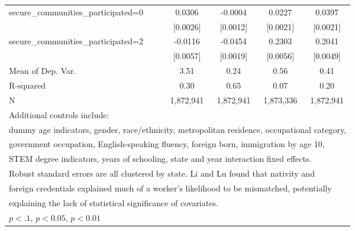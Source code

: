\begin{table}[htbp]
\begin{tabular}{l*{4}{c}}
\addlinespace
secure\_communities\_participated=0&      0.0306\sym{***}&     -0.0004         &      0.0227\sym{***}&      0.0397\sym{***}\\
                    &    [0.0026]         &    [0.0012]         &    [0.0021]         &    [0.0021]         \\
\addlinespace
secure\_communities\_participated=2&     -0.0116\sym{**} &     -0.0454\sym{***}&      0.2303\sym{***}&      0.2041\sym{***}\\
                    &    [0.0057]         &    [0.0019]         &    [0.0056]         &    [0.0049]         \\
\midrule
Mean of Dep. Var.   &        3.51         &        0.24         &        0.56         &        0.41         \\
R-squared           &        0.30         &        0.65         &        0.07         &        0.20         \\
N                   &   1,872,941         &   1,872,941         &   1,873,336         &   1,872,941         \\
\bottomrule
\multicolumn{5}{l}{\footnotesize Additional controls include:}\\
\multicolumn{5}{l}{\footnotesize dummy age indicators, gender, race/ethnicity, metropolitan residence, occupational category,}\\
\multicolumn{5}{l}{\footnotesize government occupation, English-speaking fluency, foreign born, immigration by age 10,}\\
\multicolumn{5}{l}{\footnotesize STEM degree indicators, years of schooling, state and year interaction fixed effects.}\\
\multicolumn{5}{l}{\footnotesize Robust standard errors are all clustered by state. Li and Lu found that nativity and}\\
\multicolumn{5}{l}{\footnotesize foreign credentials explained much of a worker's likelihood to be mismatched, potentially}\\
\multicolumn{5}{l}{\footnotesize explaining the lack of statistical significance of covariates.}\\
\multicolumn{5}{l}{\footnotesize \sym{*} \(p<.1\), \sym{**} \(p<0.05\), \sym{***} \(p<0.01\)}\\
\end{tabular}
\end{table}

